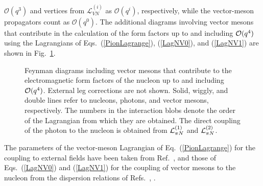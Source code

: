 \documentclass[twoside,12pt]{article}
\begin{document}
$\mathcal{O}(q^3)$ and vertices from $\mathcal{L}_{VN}^{(i)}$ as
$\mathcal{O}(q^i)$, respectively, while the vector-meson propagators count as
$\mathcal{O}(q^0)$.
   The additional diagrams involving vector mesons that contribute in the calculation of
the form factors up to and including  ${\cal O}(q^4)$ using the Lagrangians
of Eqs.\ (\ref{PionLagrange}), (\ref{LagNV0}), and (\ref{LagNV1}) are shown in
Fig.~\ref{Dia_mit}.
\begin{figure}[t]
\begin{center}
\caption{\label{Dia_mit} Feynman diagrams
including vector mesons that contribute to the electromagnetic form factors of
the nucleon up to and including ${\cal O}(q^4)$. External leg corrections are not
shown. Solid, wiggly, and double lines refer to nucleons, photons, and vector
mesons, respectively. The numbers in the interaction blobs denote the order of
the Lagrangian from which they are obtained. The direct coupling of the photon to
the nucleon is obtained from ${\cal L}_{\pi N}^{(1)}$ and ${\cal L}_{\pi
N}^{(2)}$.}
\end{center}
\end{figure}
     The parameters of the vector-meson Lagrangian of Eq.\ (\ref{PionLagrange})
for the coupling to external fields have been taken from Ref.~\cite{Ecker:1989yg},
and those of Eqs.\ (\ref{LagNV0}) and (\ref{LagNV1}) for the coupling of vector
mesons to the nucleon from the dispersion relations of
Refs.~\cite{Mergell:1995bf}, \cite{Hammer:2003ai}.
\end{document}
